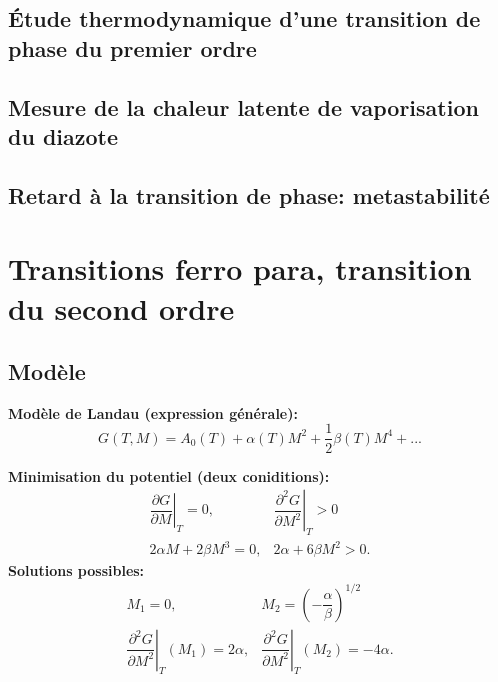 \documentclass[10pt]{beamer}
\begin{document}



\subsection{Étude thermodynamique d'une transition de phase du premier ordre}
\subsection{Mesure de la chaleur latente de vaporisation du diazote}
\subsection{Retard à la transition de phase: metastabilité}
\section{Transitions ferro para, transition du second ordre}
\subsection{Modèle}
\begin{frame}{\insertsubsection}
    \textbf{Modèle de Landau (expression générale):}
    \begin{equation}
        G(T,M) = A_0(T)+\alpha(T)M^2+\frac{1}{2}\beta(T)M^4+...
    \end{equation}

    \textbf{Minimisation du potentiel (deux coniditions):}
    \begin{equation}
        \begin{array}{cc}
            \left. \dfrac{\partial G}{\partial M}\right|_T = 0, &\left. \dfrac{\partial^2G}{\partial M^2}\right|_T >0\\
            2\alpha M+2\beta M^3 = 0, & 2\alpha + 6\beta M^2 >0.
        \end{array}
    \end{equation}
    \textbf{Solutions possibles:} 
    \begin{equation}
        \begin{array}{cc}
            M_1=0,  & M_2=\left(-\dfrac{\alpha}{\beta}\right)^{1/2}\\
            \left. \dfrac{\partial^2 G}{\partial M^2}\right|_T (M_1)=2\alpha, & \left.\dfrac{\partial^2 G}{\partial M^2}\right|_T(M_2)=-4\alpha.
        \end{array}
    \end{equation}

\end{frame}
\end{document}
